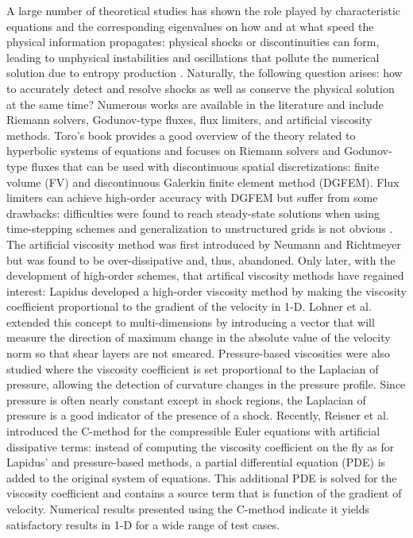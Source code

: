 A large number of theoretical studies has shown the role played by characteristic equations and the corresponding eigenvalues on how and at what speed the physical information propagates: physical shocks or discontinuities can form, leading to unphysical instabilities and oscillations that pollute the numerical solution due to entropy production \cite{Toro}. Naturally, the following question arises: how to accurately detect and resolve shocks as well as conserve the physical solution at the same time? Numerous works are available in the literature and include Riemann solvers, Godunov-type fluxes, flux limiters, and artificial viscosity methods. Toro's book \cite{Toro} provides a good overview of the theory related to hyperbolic systems of equations and focuses on Riemann solvers and Godunov-type fluxes that can be used with discontinuous spatial discretizations: finite volume (FV) and discontinuous Galerkin finite element method (DGFEM).
Flux limiters \cite{FluxLimiter1, FluxLimiter3} can achieve high-order accuracy with DGFEM \cite{FluxLimiter2} but suffer from some drawbacks: difficulties were found to reach steady-state solutions when using time-stepping schemes and generalization to unstructured grids is not obvious \cite{FluxLimiter4}. The artificial viscosity method was first introduced by Neumann and Richtmeyer \cite{Neumann} but was found to be over-dissipative and, thus, abandoned. Only later, with the development of high-order schemes, that artifical viscosity methods have regained interest: Lapidus \cite{Lapidus_paper, Lapidus_book} developed a high-order viscosity method by making the viscosity coefficient proportional to the gradient of the velocity in 1-D. Lohner et al. \cite{LMP} extended this concept to multi-dimensions by introducing a vector that will measure the direction of maximum change in the absolute value of the velocity norm so that shear layers are not smeared. Pressure-based viscosities were also studied \cite{PBV_book} where the viscosity coefficient is set proportional to the Laplacian of pressure, allowing the detection of curvature changes in the pressure profile. Since pressure is often nearly constant except in shock regions, the Laplacian of pressure is a good indicator of the presence of a shock.
Recently, Reisner et al. \cite{Reisner} introduced the C-method for the compressible Euler equations with artificial dissipative terms: instead of computing the viscosity coefficient on the fly as for Lapidus' and pressure-based methods, a partial differential equation (PDE) is added to the original system of equations. This additional PDE is solved for the viscosity coefficient and contains a source term that is function of the gradient of velocity. Numerical results presented using the C-method indicate it yields satisfactory results in 1-D for a wide range of test cases. 
